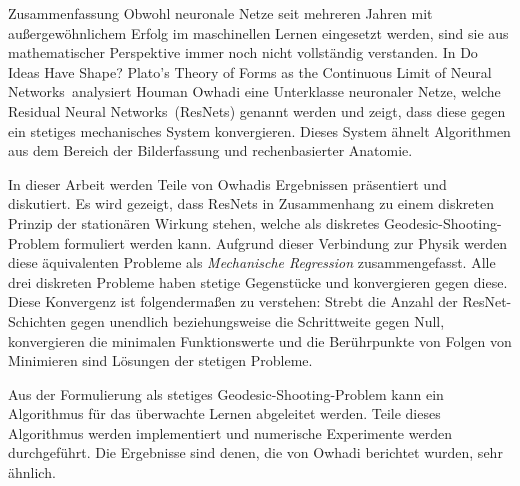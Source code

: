 \pagebreak
\begin{polyabstract}{Zusammenfassung}
	Obwohl neuronale Netze seit mehreren Jahren mit außergewöhnlichem Erfolg im maschinellen Lernen eingesetzt werden, sind sie aus mathematischer Perspektive immer noch nicht vollständig verstanden.
	In \glqq Do Ideas Have Shape? Plato's Theory of Forms as the Continuous Limit of Neural Networks\grqq~analysiert Houman Owhadi eine Unterklasse neuronaler Netze, welche \glqq Residual Neural Networks\grqq~(ResNets) genannt werden und zeigt, dass diese gegen ein stetiges mechanisches System konvergieren.
	Dieses System ähnelt Algorithmen aus dem Bereich der Bilderfassung und rechenbasierter Anatomie.
	
	In dieser Arbeit werden Teile von Owhadis Ergebnissen präsentiert und diskutiert.
	Es wird gezeigt, dass ResNets in Zusammenhang zu einem diskreten Prinzip der stationären Wirkung stehen, welche als diskretes Geodesic-Shooting-Problem formuliert werden kann.
	Aufgrund dieser Verbindung zur Physik werden diese äquivalenten Probleme als \emph{Mechanische Regression} zusammengefasst.
	Alle drei diskreten Probleme haben stetige Gegenstücke und konvergieren gegen diese.
	Diese Konvergenz ist folgendermaßen zu verstehen:
	Strebt die Anzahl der ResNet-Schichten gegen unendlich beziehungsweise die Schrittweite gegen Null, konvergieren die minimalen Funktionswerte und die Berührpunkte von Folgen von Minimieren sind Lösungen der stetigen Probleme.
	
	Aus der Formulierung als stetiges Geodesic-Shooting-Problem kann ein Algorithmus für das überwachte Lernen abgeleitet werden.
	Teile dieses Algorithmus werden implementiert und numerische Experimente werden durchgeführt.
	Die Ergebnisse sind denen, die von Owhadi berichtet wurden, sehr ähnlich.
\end{polyabstract}
